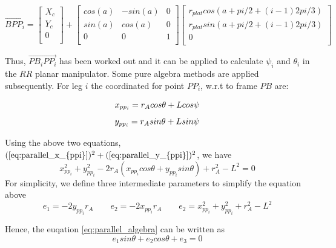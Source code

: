 \documentclass{article}
\begin{document}
\begin{equation}
\overrightarrow{B PP_i} =
\left[\begin{array}{ccc}
	X_c \\
	Y_c \\
	0 \\
\end{array}\right] 
+ \left[\begin{array}{ccc}
	cos(a) & -sin(a) & 0 \\
	sin(a) & cos(a)  & 0 \\
	0      & 0       & 1 \\
\end{array}\right]
\left[\begin{array}{ccc}
	r_{plat}cos(a+pi/2+(i-1)2pi/3) \\
	r_{plat}sin(a+pi/2+(i-1)2pi/3) \\
	0      \\
\end{array}\right]
\end{equation}

Thus, $\overrightarrow{PB_i PP_i}$ has been worked out and it can be applied to calculate $\psi_i$ and $\theta_i$ in the $RR$ planar manipulator. Some pure algebra methods are applied subsequently.
For leg $i$ the coordinated for point $PP_i$, w.r.t to frame ${PB}$ are:

\begin{equation}
\label{eq:parallel_x_{ppi}}
x_{pp_i} = r_Acos\theta+Lcos\psi
\end{equation}
\begin{equation}
\label{eq:parallel_y_{ppi}}
y_{pp_i} = r_Asin\theta+Lsin\psi
\end{equation}

Using the above two equations, $(\ref{eq:parallel_x_{ppi}})^2 + (\ref{eq:parallel_y_{ppi}})^2 $, we have
\begin{equation}
\label{eq:parallel_algebra}
x_{pp_i}^2 + y_{pp_i}^2 - 2r_A(x_{pp_i}cos\theta+y_{pp_i}sin\theta)+r_A^2-L^2 = 0
\end{equation}
For simplicity, we define three intermediate parameters to simplify the equation above
\begin{equation}
e_1 = -2y_{pp_i}r_A
\qquad
e_2 = -2x_{pp_i}r_A
\qquad
e_2 =x_{pp_i}^2+y_{pp_i}^2+r_A^2-L^2
\end{equation}

Hence, the euqation \ref{eq:parallel_algebra} can be written as
\begin{equation}
\label{eq:parallel_e}
e_1sin\theta + e_2cos\theta + e_3 = 0
\end{equation}
\end{document}
